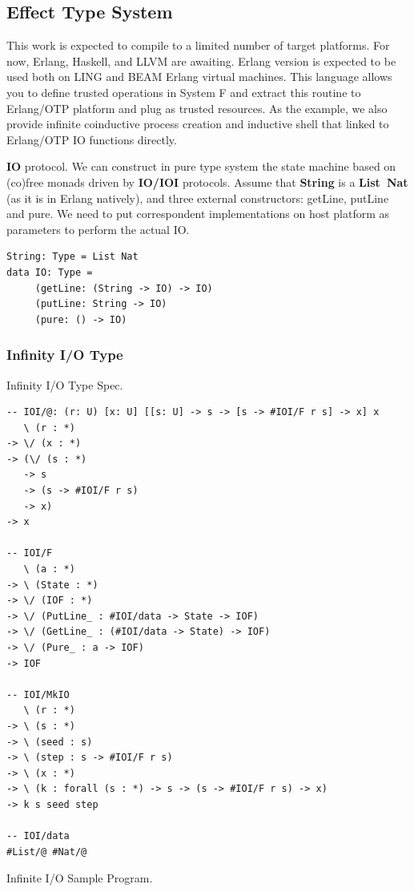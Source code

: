 \documentclass{aip-cp}
\begin{document}
\subsection{Effect Type System}
This work is expected to compile to a limited number of target platforms. For now, Erlang, Haskell, and LLVM are awaiting.
Erlang version is expected to be used both on LING and BEAM Erlang virtual machines. This language
allows you to define trusted operations in System F and extract this routine to Erlang/OTP platform
and plug as trusted resources. As the example, we also provide infinite coinductive process creation
and inductive shell that linked to Erlang/OTP IO functions directly.

{\bf IO} protocol. We can construct in pure type system the state machine based on (co)free
monads driven by {\bf IO/IOI} protocols. Assume that {\bf String} is a {\bf List\ Nat}
(as it is in Erlang natively), and three external constructors: getLine, putLine and pure.
We need to put correspondent implementations on host platform as parameters
to perform the actual IO.

\begin{lstlisting}
String: Type = List Nat
data IO: Type =
     (getLine: (String -> IO) -> IO)
     (putLine: String -> IO)
     (pure: () -> IO)
\end{lstlisting}

\subsubsection{Infinity I/O Type}

Infinity I/O Type Spec.

\begin{lstlisting}
-- IOI/@: (r: U) [x: U] [[s: U] -> s -> [s -> #IOI/F r s] -> x] x
   \ (r : *)
-> \/ (x : *)
-> (\/ (s : *)
   -> s
   -> (s -> #IOI/F r s)
   -> x)
-> x

-- IOI/F
   \ (a : *)
-> \ (State : *)
-> \/ (IOF : *)
-> \/ (PutLine_ : #IOI/data -> State -> IOF)
-> \/ (GetLine_ : (#IOI/data -> State) -> IOF)
-> \/ (Pure_ : a -> IOF)
-> IOF

-- IOI/MkIO
   \ (r : *)
-> \ (s : *)
-> \ (seed : s)
-> \ (step : s -> #IOI/F r s)
-> \ (x : *)
-> \ (k : forall (s : *) -> s -> (s -> #IOI/F r s) -> x)
-> k s seed step

-- IOI/data
#List/@ #Nat/@
\end{lstlisting}

Infinite I/O Sample Program.
\end{document}
